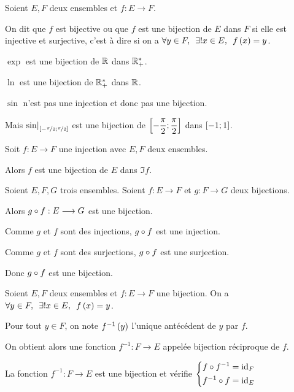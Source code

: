 \begin{defi}
Soient \(E,F\) deux ensembles et \(f:E\to F\).

On dit que \(f\) est bijective ou que \(f\) est une bijection de \(E\) dans \(F\) si elle est injective et surjective, c'est à dire si on a \(\quantifs{\forall y\in F;\exists! x\in E}f\paren{x}=y\).
\end{defi}

\begin{ex}
\(\exp\) est une bijection de \(\mathbb{R}\) dans \(\mathbb{R}_+^*\).

\(\ln\) est une bijection de \(\mathbb{R}_+^*\) dans \(\mathbb{R}\).

\(\sin\) n'est pas une injection et donc pas une bijection.

Mais \(\restr{\sin}{\intervii{-\nicefrac{\pi}{2}}{\nicefrac{\pi}{2}}}\) est une bijection de \(\left[-\dfrac{\pi}{2};\dfrac{\pi}{2}\right]\) dans \(\left[-1;1\right]\).
\end{ex}

\begin{rem}
Soit \(f:E\to F\) une injection avec \(E,F\) deux ensembles.

Alors \(f\) est une bijection de \(E\) dans \(\Im f\).
\end{rem}

\begin{prop}
Soient \(E,F,G\) trois ensembles. Soient \(f:E\to F\) et \(g:F\to G\) deux bijections.

Alors \(g\circ f:E\longrightarrow G\) est une bijection.
\end{prop}

\begin{dem}
Comme \(g\) et \(f\) sont des injections, \(g\circ f\) est une injection.

Comme \(g\) et \(f\) sont des surjections, \(g\circ f\) est une surjection.

Donc \(g\circ f\) est une bijection.
\end{dem}

\begin{defprop}
Soient \(E,F\) deux ensembles et \(f:E\to F\) une bijection. On a \(\quantifs{\forall y\in F;\exists! x\in E}f\paren{x}=y\).

Pour tout \(y\in F\), on note \(f^{-1}\left(y\right)\) l'unique antécédent de \(y\) par \(f\).

On obtient alors une fonction \(f^{-1}:F\to E\) appelée bijection réciproque de \(f\).

La fonction \(f^{-1}:F\to E\) est une bijection et vérifie \(\begin{dcases}f\circ f^{-1}=\mathrm{id}_{F} \\ f^{-1}\circ f=\mathrm{id}_{E}\end{dcases}\)
\end{defprop}


